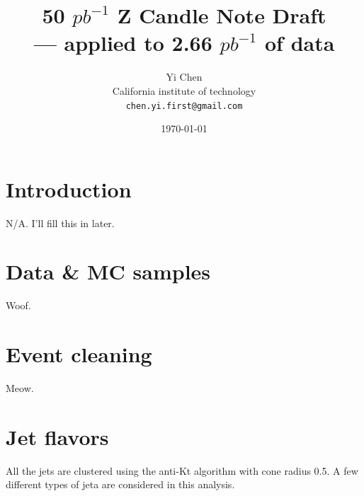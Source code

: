 \documentclass[10pt,a4paper,onecolumn]{	article}
\begin{document}
\author{Yi Chen\\
   California institute of technology\\
   \texttt{chen.yi.first@gmail.com}}
\title{50 $pb^{-1}$ Z Candle Note Draft\\ --- applied to 2.66 $pb^{-1}$ of data}
\date{\today}
\maketitle

\tableofcontents
\clearpage

\section{Introduction}

N/A.  I'll fill this in later.

\section{Data \& MC samples}

Woof.

\section{Event cleaning}

Meow.

\section{Jet flavors}

All the jets are clustered using the anti-Kt algorithm with cone radius 0.5.  A few different types of jeta are considered in
this analysis.
\end{document}
